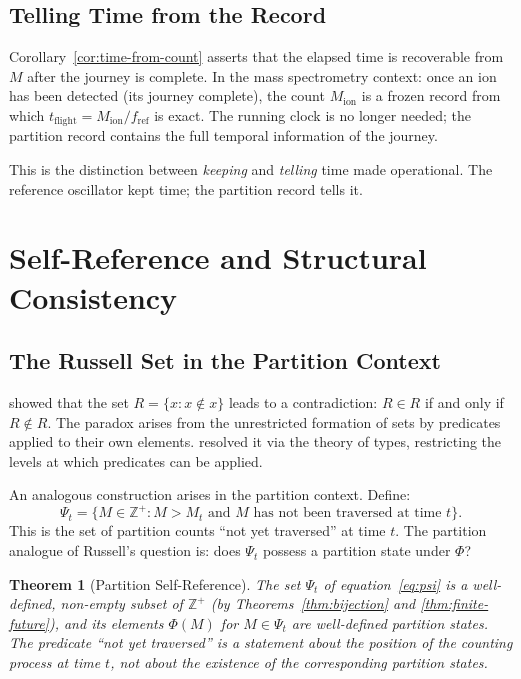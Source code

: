 \documentclass[twocolumn,10pt,a4paper]{article}
\theoremstyle{thmstyle}
\newtheorem{theorem}{Theorem}[section]
\theoremstyle{definition}
\theoremstyle{remark}
\newcommand{\Zp}{\mathbb{Z}^{+}}
\newcommand{\PhiMap}{\varPhi}
\begin{document}
\subsection{Telling Time from the Record}

Corollary~\ref{cor:time-from-count} asserts that the elapsed time is recoverable from $M$ after the journey is complete. In the mass spectrometry context: once an ion has been detected (its journey complete), the count $M_{\mathrm{ion}}$ is a frozen record from which $t_{\mathrm{flight}} = M_{\mathrm{ion}} / f_{\mathrm{ref}}$ is exact. The running clock is no longer needed; the partition record contains the full temporal information of the journey.

This is the distinction between \emph{keeping} and \emph{telling} time made operational. The reference oscillator kept time; the partition record tells it.

\section{Self-Reference and Structural Consistency}
\label{sec:self-ref}

\subsection{The Russell Set in the Partition Context}

\citet{russell1903} showed that the set $R = \{x : x \notin x\}$ leads to a contradiction: $R \in R$ if and only if $R \notin R$. The paradox arises from the unrestricted formation of sets by predicates applied to their own elements. \citet{principia} resolved it via the theory of types, restricting the levels at which predicates can be applied.

An analogous construction arises in the partition context. Define:
\begin{equation}
    \Psi_t = \{ M \in \Zp : M > M_t \text{ and } M \text{ has not been traversed at time } t\}.
    \label{eq:psi}
\end{equation}
This is the set of partition counts ``not yet traversed'' at time $t$. The partition analogue of Russell's question is: does $\Psi_t$ possess a partition state under $\PhiMap$?

\begin{theorem}[Partition Self-Reference]
\label{thm:self-ref}
The set $\Psi_t$ of equation~\eqref{eq:psi} is a well-defined, non-empty subset of $\Zp$ (by Theorems~\ref{thm:bijection} and \ref{thm:finite-future}), and its elements $\PhiMap(M)$ for $M \in \Psi_t$ are well-defined partition states. The predicate ``not yet traversed'' is a statement about the position of the counting process at time $t$, not about the existence of the corresponding partition states.
\end{theorem}
\end{document}
